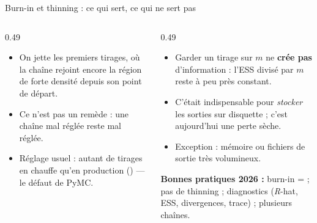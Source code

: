 \begin{frame}{Burn-in et thinning : ce qui sert, ce qui ne sert pas}
\footnotesize
\begin{columns}[t]
\begin{column}{0.49\textwidth}
\begin{kbox}
\begin{itemize}
  \item On jette les premiers tirages, où la chaîne rejoint encore la région de
        forte densité depuis son point de départ.
  \item Ce n'est pas un remède : une chaîne mal réglée reste mal réglée.
  \item Réglage usuel : autant de tirages en chauffe qu'en production
        () --- le défaut de PyMC.
\end{itemize}
\end{kbox}
\end{column}
\begin{column}{0.49\textwidth}
\begin{wbox}
\begin{itemize}
  \item Garder un tirage sur $m$ ne \textbf{crée pas} d'information : l'ESS
        divisé par $m$ reste à peu près constant.
  \item C'était indispensable pour \emph{stocker} les sorties sur disquette ;
        c'est aujourd'hui une perte sèche.
  \item Exception : mémoire ou fichiers de sortie très volumineux.
\end{itemize}
\end{wbox}
\begin{tcolorbox}[colback=byCyan!8,colframe=byCyan,arc=2mm]
\small\textbf{Bonnes pratiques 2026 :} burn-in =  ; pas de thinning ;
diagnostics (\emph{R}-hat, ESS, divergences, trace) ; plusieurs chaînes.
\end{tcolorbox}
\end{column}
\end{columns}
\end{frame}

